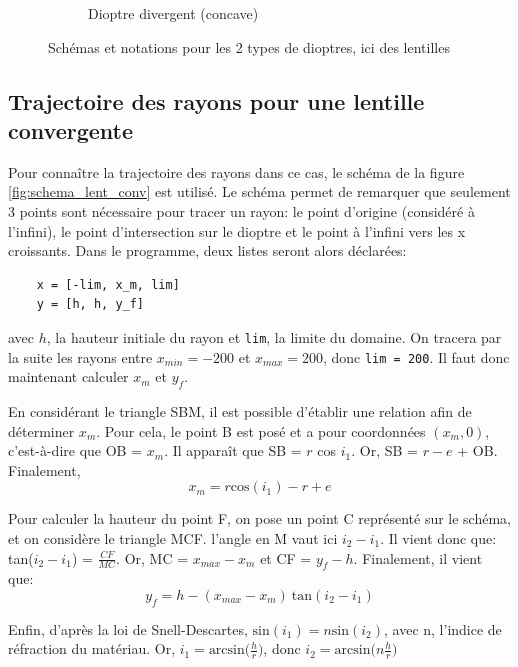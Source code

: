 \documentclass[a4paper,11pt]{article}
\begin{document}
\begin{figure}[H]
\begin{subfigure}[t]{0.45\linewidth}
		\caption{Dioptre divergent (concave)}
		\label{fig:schema_lent_div} 
    \end{subfigure}

    \caption{Schémas et notations pour les 2 types de dioptres, ici des lentilles}\label{fig:schema_lentilles}
\end{figure}

\subsection{Trajectoire des rayons pour une lentille convergente}
Pour connaître la trajectoire des rayons dans ce cas, le schéma de la figure \ref{fig:schema_lent_conv} est utilisé. Le schéma permet de remarquer que seulement 3 points sont nécessaire pour tracer un rayon: le point d'origine (considéré à l'infini), le point d'intersection sur le dioptre et le point à l'infini vers les x croissants. Dans le programme, deux listes seront alors déclarées:
\begin{verbatim}
	x = [-lim, x_m, lim]
	y = [h, h, y_f]
\end{verbatim}
avec $h$, la hauteur initiale du rayon et \verb|lim|, la limite du domaine. On tracera par la suite les rayons entre $x_{min} = -200$ et $x_{max} = 200$, donc \verb|lim = 200|. Il faut donc maintenant calculer $x_m$ et $y_f$.


En considérant le triangle SBM, il est possible d'établir une relation afin de déterminer $x_m$. Pour cela, le point B est posé et a pour coordonnées $(x_m, 0)$, c'est-à-dire que OB = $x_m$. Il apparaît que SB = $r$ cos $i_1$. Or, SB = $r - e$ + OB. 
Finalement, 
\begin{equation*}
	x_m = r \text{cos}(i_1) - r + e
\end{equation*}

Pour calculer la hauteur du point F, on pose un point C représenté sur le schéma, et on considère le triangle MCF. l'angle en M vaut ici $i_2 - i_1$. Il vient donc que: tan($i_2 - i_1$) = $\frac{CF}{MC}$. Or, MC = $x_{max} - x_m$ et CF = $y_f - h$. Finalement, il vient que:
\begin{equation*}
	y_f = h - (x_{max} - x_m) \: \text{tan} (i_2 - i_1)
\end{equation*}


Enfin, d'après la loi de Snell-Descartes, $\text{sin}(i_1) = n \text{sin}(i_2)$, avec n, l'indice de réfraction du matériau. Or, $i_1 = \text{arcsin}\big( \frac{h}{r}\big)$, donc $i_2 = \text{arcsin}\big( n \frac{h}{r}\big)$
\end{document}
